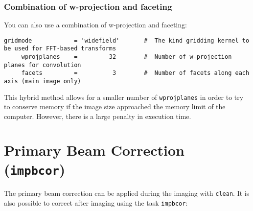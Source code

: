 \subsubsection{Combination of w-projection and faceting}
\label{section:im.clean.widefield.combo}

You can also use a combination of w-projection and faceting:
\small
\begin{verbatim}
gridmode            = 'widefield'       #  The kind gridding kernel to be used for FFT-based transforms
     wprojplanes    =         32        #  Number of w-projection planes for convolution
     facets         =          3        #  Number of facets along each axis (main image only)
\end{verbatim}
\normalsize
This hybrid method allows for a smaller number of {\tt wprojplanes} in order
to try to conserve memory if the image size approached the memory limit
of the computer.  However, there is a large penalty in execution time.


\section{Primary Beam Correction ({\tt impbcor})}
\label{section:im.impbcor}

The primary beam correction can be applied during the imaging with {\tt clean}. It is also possible to correct after imaging using the task {\tt impbcor}:

